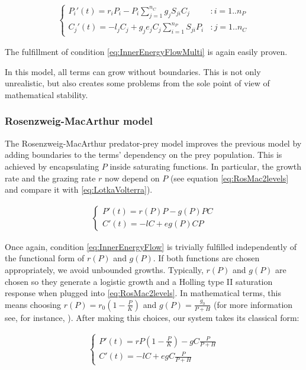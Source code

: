 \begin{eqnarray}
\label{eq:LotkaVolterraMulti}
	\begin{cases}
	P_i'(t) = r_i P_i - P_i \sum_{j = 1}^{n_C} g_j S_{ji} C_j & : i = 1..n_P
	\\
	C_j'(t) = - l_j C_j +  g_j e_j C_j \sum_{i = 1}^{n_P} S_{ji} P_i  & : j = 1..n_C
	\end{cases}
\end{eqnarray}

The fulfillment of condition \ref{eq:InnerEnergyFlowMulti} is again easily proven.

In this model, all terms can grow without boundaries. This is not only unrealistic, but also creates some problems from the sole point of view of mathematical stability.

\subsubsection{Rosenzweig-MacArthur model}
\label{subsubsec:Rosenzweig-MacArthur}
The Rosenzweig-MacArthur predator-prey model improves the previous model by adding boundaries to the terms' dependency on the prey population. This is achieved by encapsulating $P$ inside saturating functions. In particular, the growth rate and the grazing rate $r$ now depend on $P$ (see equation \ref{eq:RosMac2levels} and compare it with \ref{eq:LotkaVolterra}).

\begin{eqnarray}
\label{eq:RosMac2levels}
	\begin{cases}
	P'(t) = r(P) P - g(P) P C
	\\
	C'(t) = - l C + e g(P) C P
	\end{cases}
\end{eqnarray}

Once again, condition \ref{eq:InnerEnergyFlow} is trivially fulfilled independently of the functional form of $r(P)$ and $g(P)$. If both functions are chosen appropriately, we avoid unbounded growths. Typically, $r(P)$ and $g(P)$ are chosen so they generate a logistic growth and a Holling type II saturation response when plugged into \ref{eq:RosMac2levels}. In mathematical terms, this means choosing $r(P) = r_0 \left(1 - \frac{P}{K} \right)$ and $g(P) = \frac{g_0}{P+H}$ (for more information see, for instance, \cite{Edelstein-Keshet}). After making this choices, our system takes its classical form:

\begin{eqnarray}
\label{eq:RosMac2classic}
	\begin{cases}
	P'(t) =  r P \left( 1 - \frac{P}{K} \right) - g C \frac{P}{P + H}
	\\
	C'(t) = - l C + e g C \frac{P}{P + H}
	\end{cases}
\end{eqnarray}

